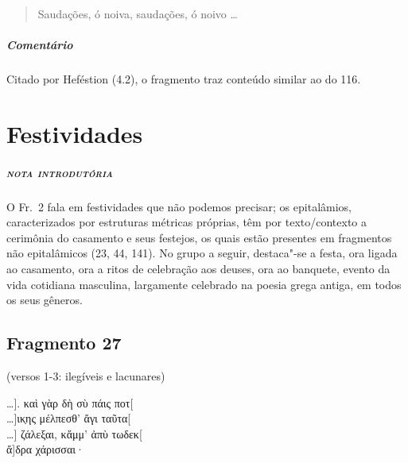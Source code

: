 {\begin{verse}
Saudações, ó noiva, saudações, ó noivo \ldots{}
\end{verse}

{\paragraph{Comentário} Citado por Heféstion (4.2), o fragmento traz conteúdo similar ao do 116.}


\chapter{Festividades}

\paragraph{\textsc{nota introdutória}}
O Fr.~2 fala em festividades que não podemos precisar; os epitalâmios,
caracterizados por estruturas métricas próprias, têm por texto/contexto a
cerimônia do casamento e seus festejos, os quais estão presentes em fragmentos não epitalâmicos (23, 44, 141). No grupo a seguir, destaca"-se a festa,
ora ligada ao casamento, ora a ritos de celebração aos deuses, ora ao banquete,
evento da vida cotidiana masculina, largamente celebrado na poesia grega
antiga, em todos os seus gêneros.

\section{Fragmento 27}

\begin{gkverse}
\textnormal{(versos 1-3: ilegíveis e lacunares)}

\ldots{}]. καὶ γὰρ δὴ σὺ πάις ποτ[\\
\ldots{}]ικ̣ης μέλπεσθ’ ἄγι ταῦτα[\\
\ldots{}] ζάλεξαι, κἄμμ’ ἀπὺ τωδεκ[\\
ἄ]δρα χάρισσαι·


\end{gkverse}}
